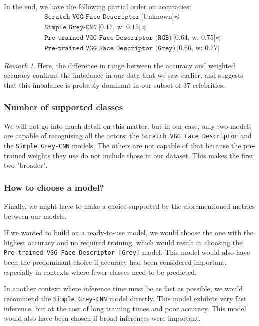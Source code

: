 \documentclass[9pt,twocolumn,twoside]{ilcss}
\theoremstyle{definition}
\theoremstyle{remark}
\newtheorem{remark}{Remark}[section]
\theoremstyle{definition}
\theoremstyle{definition}
\begin{document}
    In the end, we have the following partial order on accuracies:
    \begin{align*}
       & \texttt{Scratch VGG Face Descriptor}\ \text{[Unknown]} \preceq\\ 
       & \texttt{Simple Grey-CNN}\ \text{[0.17, w: 0.15]} \preceq\\
       & \texttt{Pre-trained VGG Face Descriptor (RGB)}\ \text{[0.64, w: 0.75]}\preceq\\
       & \texttt{Pre-trained VGG Face Descriptor (Grey)}\ \text{[0.66, w: 0.77]}
    \end{align*}

    \begin{remark}
        Here, the difference in range between the accuracy and weighted accuracy confirms the imbalance in our data that we saw earlier, and suggests that this imbalance is probably dominant in our subset of 37 celebrities.
    \end{remark}
    
    \subsubsection*{Number of supported classes}
    We will not go into much detail on this matter, but in our case, only two models are capable of recognising all the actors: the \texttt{Scratch VGG Face Descriptor} and the \texttt{Simple Grey-CNN} models. The others are not capable of that because the pre-trained weights they use do not include those in our dataset. This makes the first two "broader".

    \subsubsection*{How to choose a model?}
    Finally, we might have to make a choice supported by the aforementioned metrics between our models.
    
    If we wanted to build on a ready-to-use model, we would choose the one with the highest accuracy and no required training, which would result in choosing the \texttt{Pre-trained VGG Face Descriptor [Grey]} model. This model would also have been the predominant choice if accuracy had been considered important, especially in contexts where fewer classes need to be predicted.

    In another context where inference time must be as fast as possible, we would recommend the \texttt{Simple Grey-CNN} model directly. This model exhibits very fast inference, but at the cost of long training times and poor accuracy. This model would also have been chosen if broad inferences were important.
\end{document}

